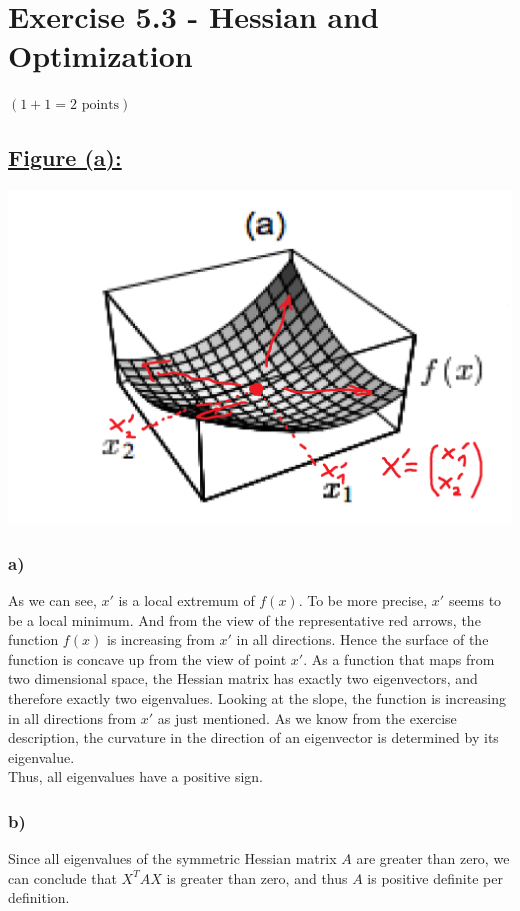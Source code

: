 \documentclass[a4paper]{article}
\begin{document}
\newpage
\section*{Exercise 5.3 - Hessian and Optimization}
$(1+1 = 2 \text{ points})$
    \subsection*{\underline{Figure (a):}}
        \includegraphics[width=0.8\linewidth]{Assignment 5/1.png}
        \subsubsection*{a)}
            As we can see, $x'$ is a local extremum of $f(x)$. To be more precise, $x'$ seems to be a local minimum.
            And from the view of the representative red arrows, the function $f(x)$ is increasing from $x'$ in all directions.
            Hence the surface of the function is concave up from the view of point $x'$.
            As a function that maps from two dimensional space, the Hessian matrix has exactly two eigenvectors, and therefore exactly two eigenvalues.
            Looking at the slope, the function is increasing in all directions from $x'$ as just mentioned.
            As we know from the exercise description, the curvature in the direction of an eigenvector is determined by its eigenvalue.\\
            Thus, all eigenvalues have a positive sign.

        \subsubsection*{b)}
            Since all eigenvalues of the symmetric Hessian matrix $A$ are greater than zero, we can conclude that $X^T A X$ is greater than zero, and thus $A$ is positive definite per definition.
\end{document}
